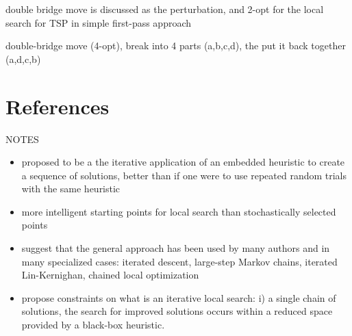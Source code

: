 \documentclass[a4paper, 11pt]{article}
\begin{document}

double bridge move is discussed as the perturbation, and 2-opt for the local search for TSP in \cite{Ramalhinho-Lourenco2003}
simple first-pass approach

double-bridge move (4-opt), break into 4 parts (a,b,c,d), the put it back together (a,d,c,b)




\section{References}
\label{sec:references}

NOTES
\begin{itemize}
	\item proposed to be a the iterative application of an embedded heuristic to create a sequence of solutions, better than if one were to use repeated random trials with the same heuristic
	\item more intelligent starting points for local search than stochastically selected points
	\item \cite{Ramalhinho-Lourenco2003} suggest that the general approach has been used by many authors and in many specialized cases: iterated descent, large-step Markov chains, iterated Lin-Kernighan, chained local optimization
	\item \cite{Ramalhinho-Lourenco2003} propose constraints on what is an iterative local search: i) a single chain of solutions, the search for improved solutions occurs within a reduced space provided by a black-box heuristic.
	
\end{itemize}


% 
% 
\end{document}
